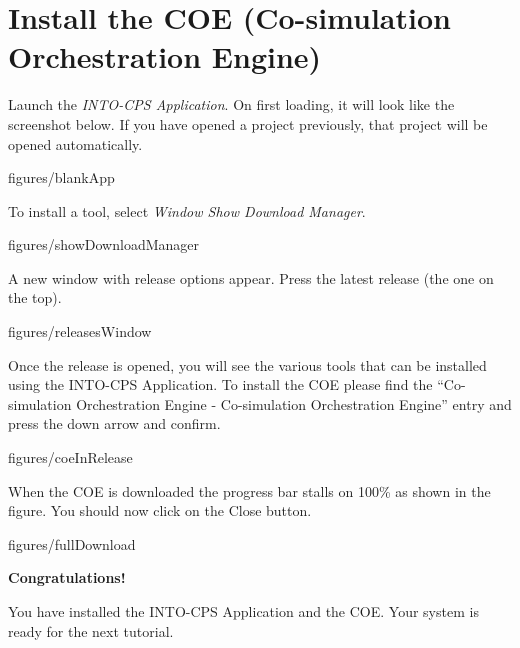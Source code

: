 \documentclass[11pt,a4paper]{../tutorial}
\begin{document}
\newpage 

\section{Install the COE (Co-simulation Orchestration Engine)}

\begin{instructions}
\item Launch the \emph{INTO-CPS Application}. On first loading, it will look like the screenshot below. If you have opened a project previously, that project will be opened automatically.

\begin{annotation}[width=0.85\linewidth]{figures/blankApp}
\end{annotation}

\item To install a tool, select \emph{Window \menusep Show Download Manager}.

\begin{annotation}[width=0.85\linewidth,trim=0 260 0 0,clip]{figures/showDownloadManager}
\end{annotation}

\newpage
\item A new window with release options appear. Press the latest release (the one on the top).

\begin{annotation}[width=0.85\linewidth,trim=0 160 0 0,clip]{figures/releasesWindow}
\end{annotation}


\item Once the release is opened, you will see the various tools that can be installed using the INTO-CPS Application. To install the COE please find the ``Co-simulation Orchestration Engine - Co-simulation Orchestration Engine'' entry and press the down arrow and confirm. 

\begin{annotation}[width=0.85\linewidth]{figures/coeInRelease}
\end{annotation}

\newpage
\item  When the COE is downloaded the progress bar stalls on 100\% as shown in the figure. You should now click on the Close button.    

\begin{annotation}[width=0.85\linewidth]{figures/fullDownload}
\end{annotation}


    \bigskip
    \bigskip
    {\large\bfseries Congratulations!}

    You have installed the INTO-CPS Application and the COE. Your system is ready for the next tutorial.

\end{instructions}
\end{document}
